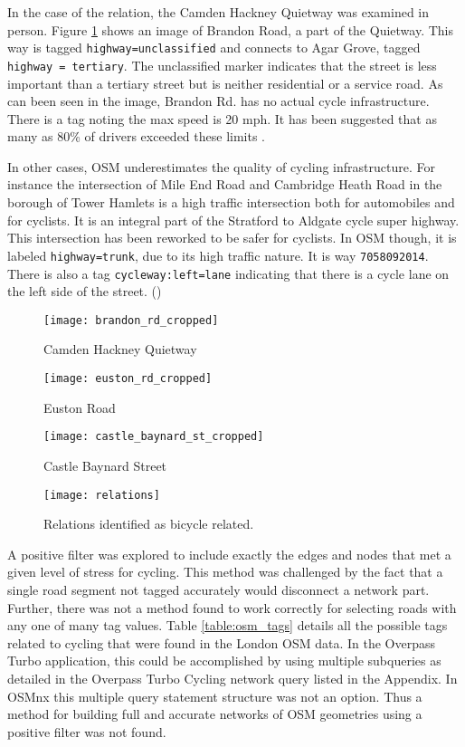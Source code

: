 In the case of the relation, the Camden Hackney Quietway was examined in person. Figure \ref{fig:brandon} shows an image of Brandon Road, a part of the Quietway. This way is tagged \texttt{highway=unclassified} and connects to Agar Grove, tagged \texttt{highway = tertiary}. The unclassified marker indicates that the street is less important than a tertiary street but is neither residential or a service road. As can been seen in the image, Brandon Rd. has no actual cycle infrastructure. There is a tag noting the max speed is 20 mph. It has been suggested that as many as 80\% of drivers exceeded these limits \parencite{sun}. 

In other cases, OSM underestimates the quality of cycling infrastructure. For instance the intersection of Mile End Road and Cambridge Heath Road in the borough of Tower Hamlets is a high traffic intersection both for automobiles and for cyclists. It is an integral part of the Stratford to Aldgate cycle super highway. This intersection has been reworked to be safer for cyclists. In OSM though, it is labeled \texttt{highway=trunk}, due to its high traffic nature. It is way \texttt{7058092014}. There is also a tag \texttt{cycleway:left=lane} indicating that there is a cycle lane on the left side of the street. (\cite{osm})


\begin{figure}
\centering
\texttt{[image: brandon\_rd\_cropped]}
\caption{Camden Hackney Quietway}
\label{fig:brandon}
\end{figure}

\begin{figure}
\centering
\texttt{[image: euston\_rd\_cropped]}
\caption{Euston Road}
\label{fig:euston}
\end{figure}

\begin{figure}
  \centering
  \texttt{[image: castle\_baynard\_st\_cropped]}
  \caption{Castle Baynard Street}
  \label{fig:baynard}
\end{figure}

\begin{figure}
\centering
\texttt{[image: relations]}
\caption{Relations identified as bicycle related.}
\label{fig:bicycle_relation}
\end{figure}

A positive filter was explored to include exactly the edges and nodes that met a given level of stress for cycling. This method was challenged by the fact that a single road segment not tagged accurately would disconnect a network part. Further, there was not a method found to work correctly for selecting roads with any one of many tag values.  Table \ref{table:osm_tags} details all the possible tags related to cycling that were found in the London OSM data.  In the Overpass Turbo application, this could be accomplished by using multiple subqueries as detailed in the Overpass Turbo Cycling network query listed in the Appendix. In OSMnx this multiple query statement structure was not an option. Thus a method for building full and accurate networks of OSM geometries using a positive filter was not found. 

